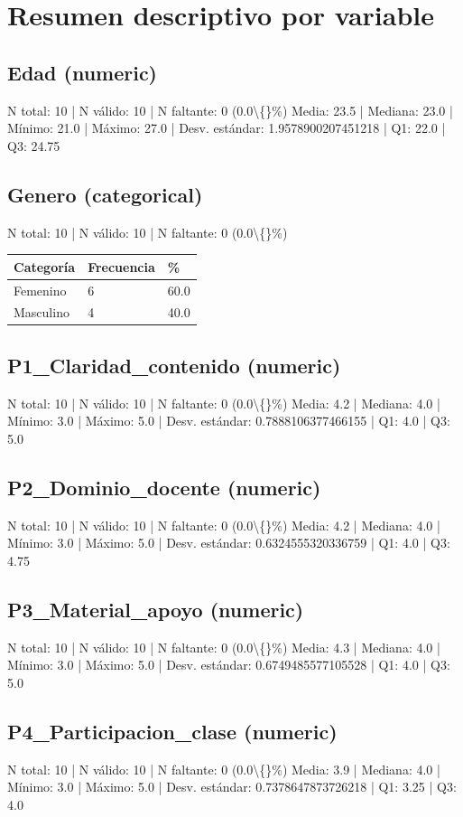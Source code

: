 \documentclass[12pt,a4paper]{article}
\begin{document}
\section{Resumen descriptivo por variable}
\subsection{Edad (numeric)}
N total: 10 | N válido: 10 | N faltante: 0 (0.0\textbackslash\{\}\%)
Media: 23.5 | Mediana: 23.0 | Mínimo: 21.0 | Máximo: 27.0 | Desv. estándar: 1.9578900207451218 | Q1: 22.0 | Q3: 24.75
\subsection{Genero (categorical)}
N total: 10 | N válido: 10 | N faltante: 0 (0.0\textbackslash\{\}\%)
\begin{longtable}{p{8cm}p{3cm}p{3cm}}
\toprule
Categoría & Frecuencia & \% \\
\midrule
\endhead
Femenino & 6 & 60.0 \\
Masculino & 4 & 40.0 \\
\bottomrule
\end{longtable}
\subsection{P1\_Claridad\_contenido (numeric)}
N total: 10 | N válido: 10 | N faltante: 0 (0.0\textbackslash\{\}\%)
Media: 4.2 | Mediana: 4.0 | Mínimo: 3.0 | Máximo: 5.0 | Desv. estándar: 0.7888106377466155 | Q1: 4.0 | Q3: 5.0
\subsection{P2\_Dominio\_docente (numeric)}
N total: 10 | N válido: 10 | N faltante: 0 (0.0\textbackslash\{\}\%)
Media: 4.2 | Mediana: 4.0 | Mínimo: 3.0 | Máximo: 5.0 | Desv. estándar: 0.6324555320336759 | Q1: 4.0 | Q3: 4.75
\subsection{P3\_Material\_apoyo (numeric)}
N total: 10 | N válido: 10 | N faltante: 0 (0.0\textbackslash\{\}\%)
Media: 4.3 | Mediana: 4.0 | Mínimo: 3.0 | Máximo: 5.0 | Desv. estándar: 0.6749485577105528 | Q1: 4.0 | Q3: 5.0
\subsection{P4\_Participacion\_clase (numeric)}
N total: 10 | N válido: 10 | N faltante: 0 (0.0\textbackslash\{\}\%)
Media: 3.9 | Mediana: 4.0 | Mínimo: 3.0 | Máximo: 5.0 | Desv. estándar: 0.7378647873726218 | Q1: 3.25 | Q3: 4.0
\end{document}
